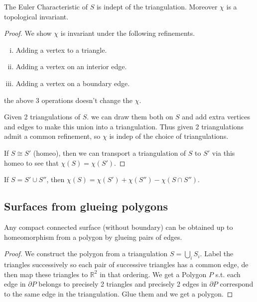 \documentclass{article}
\begin{document}
\begin{theorem}
    The Euler Characteristic of $S$ is indept of the triangulation. Moreover $\chi$ is a topological invariant.
\end{theorem}
\begin{proof}
    We show $\chi$ is invariant under the following refinements.
    \begin{enumerate}[(i)]
        \item Adding a vertex to a triangle.
        \item Adding a vertex on an interior edge.
        \item Adding a vertex on a boundary edge.
    \end{enumerate}
    the above 3 operations doesn't change the $\chi$.
    
    Given 2 triangulations of $S$. we can draw them both on $S$ and add extra vertices and edges to make this union into a triangulation.
    Thus given 2 triangulations admit a common refinement, so $\chi$ is indep of the choice of triangulations.
    
    If $S \cong S'$ (homeo), then we can transport a triangulation of $S$ to $S'$ via this homeo to see that $\chi(S) = \chi(S')$.
\end{proof}

\begin{remark}
    If $S = S' \cup S''$, then $\chi(S) = \chi(S') + \chi(S'') - \chi(S \cap S'')$.
\end{remark}

\subsection{Surfaces from glueing polygons}

\begin{proposition}
    Any compact connected surface (without boundary) can be obtained up to homeomorphism from a polygon by glueing pairs of edges.
\end{proposition}
\begin{proof}
    We construct the polygon from a triangulation $S = \bigcup_i S_i$.
    Label the triangles successively so each pair of successive triangles has a common edge, de then map these triangles to $\mathbb{R}^2$ in that ordering.
    We get a Polygon $P$ s.t. each edge in $\partial P$ belongs to precisely 2 triangles and precisely 2 edges in $\partial P$ correspond to the same edge in the triangulation. Glue them and we get a polygon.
\end{proof}
\end{document}

